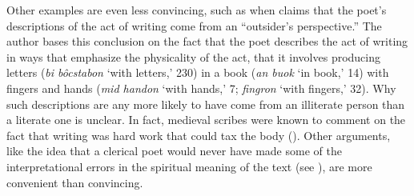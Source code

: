 Other examples are even less convincing, such as when \citet[184--185]{Haferland2010} claims that the poet’s descriptions of the act of writing come from an “outsider’s perspective.” The author bases this conclusion on the fact that the poet describes the act of writing in ways that emphasize the physicality of the act, that it involves producing letters (\textit{bi bôcstabon} ‘with letters,’ 230) in a book (\textit{an buok} ‘in book,’ 14) with fingers and hands (\textit{mid handon} ‘with hands,’ 7; \textit{fingron} ‘with fingers,’ 32). Why such descriptions are any more likely to have come from an illiterate person than a literate one is unclear. In fact, medieval scribes were known to comment on the fact that writing was hard work that could tax the body (\citealt[41, 43]{Gullick1995}). Other arguments, like the idea that a clerical poet would never have made some of the interpretational errors in the spiritual meaning of the text (see \citealt[192--200]{Haferland2010}), are more convenient than convincing.

